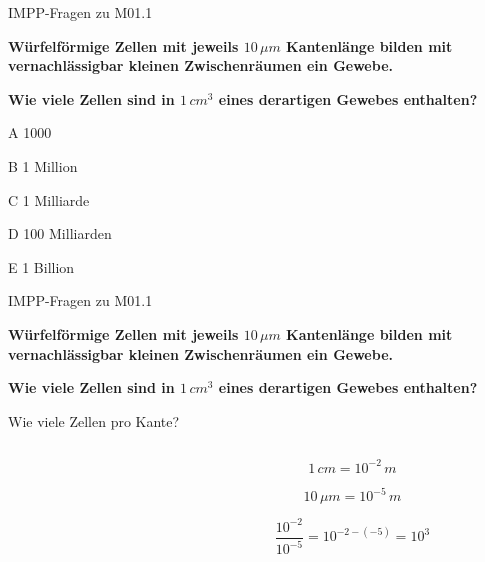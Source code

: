 \documentclass{beamer}
\begin{document}


\begin{frame}{IMPP-Fragen zu M01.1}

\textbf{Würfelförmige Zellen mit jeweils \(10\,\mu m\) Kantenlänge  bilden mit vernachlässigbar kleinen Zwischenräumen ein Gewebe.}

\textbf{Wie viele Zellen sind in \(1\,cm^3 \) eines derartigen Gewebes enthalten?}

\begin{decription}
\item[A]
1000
\item[B]
1 Million
\item[C]
1 Milliarde
\item[D]
100 Milliarden
\item[E]
1 Billion
\end{decription}

    
\end{frame}

\begin{frame}{IMPP-Fragen zu M01.1}

\textbf{Würfelförmige Zellen mit jeweils \(10\,\mu m\) Kantenlänge  bilden mit vernachlässigbar kleinen Zwischenräumen ein Gewebe.}

\textbf{Wie viele Zellen sind in \(1\,cm^3 \) eines derartigen Gewebes enthalten?}


Wie viele Zellen pro Kante? 



\begin{columns}[c]


\begin{column}{5cm}



\end{column}


\begin{column}{5cm}


\[1\,cm = 10^{-2}\,m\]

\[10\,\mu m = 10^{-5}\,m\]

\[

\frac{10^{-2}}{10^{-5}} = 10^{-2-(-5)} = 10^3
 
\]


\end{column}



\end{columns}

    
\end{frame}
\end{document}
